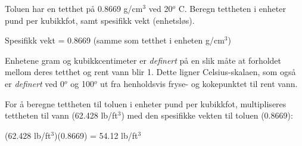 

Toluen har en tetthet på 0.8669 g/cm$^{3}$ ved 20$^{o}$ C.  Beregn tettheten i enheter pund per kubikkfot, samt spesifikk vekt (enhetsløs).







Spesifikk vekt = 0.8669 (samme som tetthet i enheten g/cm$^{3}$)

\vskip 10pt

Enhetene gram og kubikkcentimeter er {\it definert} på en slik måte at forholdet mellom deres tetthet og rent vann blir 1.  Dette ligner Celsius-skalaen, som også er {\it definert} ved 0$^{o}$ og 100$^{o}$ ut fra henholdsvis fryse- og kokepunktet til rent vann.

For å beregne tettheten til toluen i enheter pund per kubikkfot, multipliseres tettheten til vann (62.428 lb/ft$^{3}$) med den spesifikke vekten til toluen (0.8669):

\vskip 10pt

(62.428 lb/ft$^{3}$)(0.8669) = 54.12 lb/ft$^{3}$









